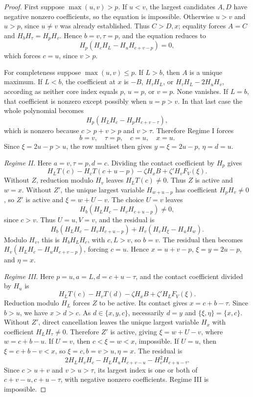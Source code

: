 \documentclass[11pt,a4paper]{amsart}
\numberwithin{equation}{section}
\theoremstyle{plain}
\theoremstyle{definition}
\begin{document}
\begin{proof}
First suppose \(\max(u,v)>p\).  If \(u<v\), the largest candidates
\(A,D\) have negative nonzero coefficients, so the equation is impossible.  
Otherwise \(u>v\) and \(u>p\), since \(u\ne v\) was already established.  
Thus \(C>D,x\); equality forces
\(A=C\) and \(H_bH_\tau=H_pH_v\).  Hence \(b=v,\tau=p\), and
the equation reduces to
\[
 H_p(H_cH_L-H_uH_{c+v-p})=0,
\]
which forces \(c=u\), since \(v>p\).  

For completeness suppose \(\max(u,v)\le p\).  If \(L>b\), then
\(A\) is a unique maximum.  If \(L<b\), the coefficient at \(x\)
is \(-B\), \(H_\tau H_L\), or \(H_\tau H_L-2H_uH_v\), according
as neither core index equals \(p\), \(u=p\), or \(v=p\).  None
vanishes.  If \(L=b\), that coefficient is nonzero except possibly
when \(u=p>v\).  In that last case the whole polynomial becomes
\[
 H_p(H_LH_c-H_pH_{c+v-\tau}),
\]
which is nonzero because \(c>p+v>p\) and \(v>\tau\).  
Therefore Regime I forces
\[
 b=v,\quad \tau=p,\quad c=u,\quad x=u.
\]
Since \(\xi=2u-p>u\), the row multiset then gives
\(y=\xi=2u-p\), \(\eta=d=u\).  

\emph{Regime II.}
Here \(a=v,\tau=p,d=c\).  Dividing the contact coefficient by
\(H_p\) gives
\[
 H_LT(c)-H_vT(c+u-p)-\zeta H_xB+\zeta'H_vF_V(\xi).
\]
Without \(Z\), reduction modulo \(H_v\) leaves \(H_LT(c)\ne0\).  
Thus \(Z\) is active and \(w=x\).  Without \(Z'\), the unique
largest variable \(H_{w+u-p}\) has coefficient \(H_pH_v\ne0\), so
\(Z'\) is active and \(\xi=w+U-v\).  The choice \(U=v\) leaves
\[
 H_b(H_LH_c-H_vH_{c+u-p})\ne0,
\]
since \(c>v\).  Thus \(U=u,V=v\), and the residual is
\[
 H_b(H_LH_c-H_vH_{c+u-p})
 +H_v(H_vH_\xi-H_uH_w).
\]
Modulo \(H_v\), this is \(H_bH_LH_c\), with \(c,L>v\), so
\(b=v\).  The residual then becomes
\(H_v(H_LH_c-H_uH_{c+v-p})\), forcing \(c=u\).  Hence
\(x=u+v-p\), \(\xi=y=2u-p\), and \(\eta=x\).  

\emph{Regime III.}
Here \(p=u,a=L,d=c+u-\tau\), and the contact coefficient divided by
\(H_u\) is
\[
 H_LT(c)-H_vT(d)-\zeta H_xB+\zeta'H_LF_V(\xi).
\]
Reduction modulo \(H_L\) forces \(Z\) to be active.  Its contact
gives \(x=c+b-\tau\).  Since \(b>u\), we have \(x>d>c\).  
As \(d\in\{x,y,c\}\), necessarily \(d=y\) and
\(\{\xi,\eta\}=\{x,c\}\).  Without \(Z'\), direct cancellation
leaves the unique largest variable \(H_x\) with coefficient
\(H_LH_\tau\ne0\).  Therefore \(Z'\) is active, giving
\(\xi=w+U-v\), where \(w=c+b-u\).  
If \(U=v\), then \(c<\xi=w<x\), impossible.  If \(U=u\), then
\(\xi=c+b-v<x\), so \(\xi=c,b=v>u,\eta=x\).  The residual is
\[
 2H_LH_vH_c-H_LH_uH_{c+v-u}-H_v^2H_{c+u-\tau}.
\]
Since \(c>u+v\) and \(v>u>\tau\), its largest index is one or both
of \(c+v-u,c+u-\tau\), with negative nonzero coefficients.  Regime
III is impossible.  


\end{proof}
\end{document}

